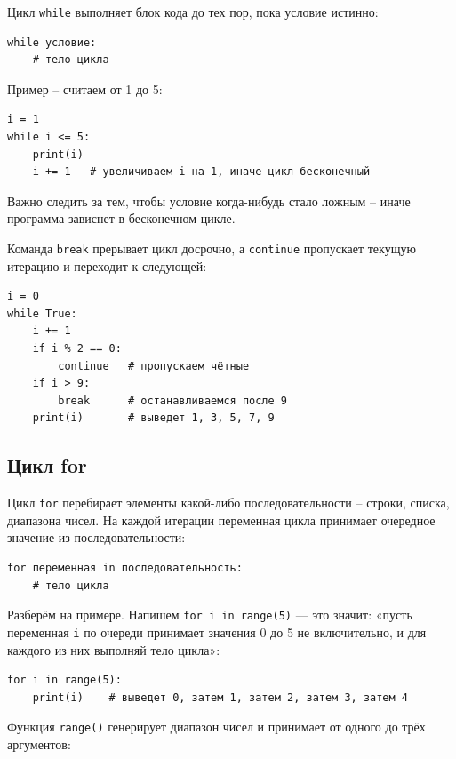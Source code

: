 \documentclass[12pt,a4paper]{article}
\begin{document}
Цикл \texttt{while} выполняет блок кода до тех пор, пока условие истинно:

\begin{verbatim}
while условие:
    # тело цикла
\end{verbatim}

Пример -- считаем от 1 до 5:

\begin{verbatim}
i = 1
while i <= 5:
    print(i)
    i += 1   # увеличиваем i на 1, иначе цикл бесконечный
\end{verbatim}

Важно следить за тем, чтобы условие когда-нибудь стало ложным -- иначе программа зависнет в бесконечном цикле.

Команда \texttt{break} прерывает цикл досрочно, а \texttt{continue} пропускает текущую итерацию и переходит к следующей:

\begin{verbatim}
i = 0
while True:
    i += 1
    if i % 2 == 0:
        continue   # пропускаем чётные
    if i > 9:
        break      # останавливаемся после 9
    print(i)       # выведет 1, 3, 5, 7, 9
\end{verbatim}


\subsection*{Цикл for}

Цикл \texttt{for} перебирает элементы какой-либо последовательности -- строки, списка, диапазона чисел. На каждой итерации переменная цикла принимает очередное значение из последовательности:

\begin{verbatim}
for переменная in последовательность:
    # тело цикла
\end{verbatim}

Разберём на примере. Напишем \texttt{for i in range(5)} --- это значит: «пусть переменная \texttt{i} по очереди принимает значения 0 до 5 не включительно, и для каждого из них выполняй тело цикла»:

\begin{verbatim}
for i in range(5):
    print(i)    # выведет 0, затем 1, затем 2, затем 3, затем 4
\end{verbatim}

\medskip
\noindent Функция \texttt{range()} генерирует диапазон чисел и принимает от одного до трёх аргументов:
\end{document}
